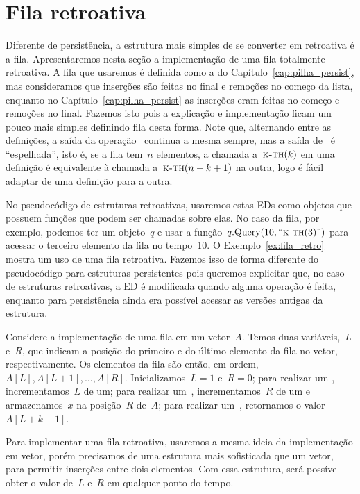 \documentclass[main.tex]{subfiles}
\begin{document}
\chapter{Fila retroativa} \label{cap:pilha_retro}

Diferente de persistência, a estrutura mais simples de se converter em retroativa é a fila. Apresentaremos nesta seção a implementação de uma fila totalmente retroativa. A fila que usaremos é definida como a do Capítulo~\ref{cap:pilha_persist}, mas consideramos que inserções são feitas no final e remoções no começo da lista, enquanto no Capítulo~\ref{cap:pilha_persist} as inserções eram feitas no começo e remoções no final. Fazemos isto pois a explicação e implementação ficam um pouco mais simples definindo fila desta forma. Note que, alternando entre as definições, a saída da operação~ continua a mesma sempre, mas a saída de~ é ``espelhada'', isto é, se a fila tem~$n$ elementos, a chamada a~$\Call{k-th}{k}$ em uma definição é equivalente à chamada a~$\Call{k-th}{n-k+1}$ na outra, logo é fácil adaptar de uma definição para a outra.

No pseudocódigo de estruturas retroativas, usaremos estas EDs como objetos que possuem funções que podem ser chamadas sobre elas. No caso da fila, por exemplo, podemos ter um objeto~$q$ e usar a função~$q.\text{Query}(10, ``\textsc{k-th}(3)")$ para acessar o terceiro elemento da fila no tempo~10. O Exemplo~\ref{ex:fila_retro} mostra um uso de uma fila retroativa. Fazemos isso de forma diferente do pseudocódigo para estruturas persistentes pois queremos explicitar que, no caso de estruturas retroativas, a ED é modificada quando alguma operação é feita, enquanto para persistência ainda era possível acessar as versões antigas da estrutura.

Considere a implementação de uma fila em um vetor~$A$. Temos duas variáveis,~$L$ e~$R$, que indicam a posição do primeiro e do último elemento da fila no vetor, respectivamente. Os elementos da fila são então, em ordem,~$A[L], A[L + 1], \ldots, A[R]$. Inicializamos~$L = 1$ e~$R = 0$; para realizar um , incrementamos~$L$ de um; para realizar um~, incrementamos~$R$ de um e armazenamos~$x$ na posição~$R$ de~$A$; para realizar um~, retornamos o valor~$A[L + k - 1]$.

Para implementar uma fila retroativa, usaremos a mesma ideia da implementação em vetor, porém precisamos de uma estrutura mais sofisticada que um vetor, para permitir inserções entre dois elementos. Com essa estrutura, será possível obter o valor de~$L$ e~$R$ em qualquer ponto do tempo.
\end{document}
